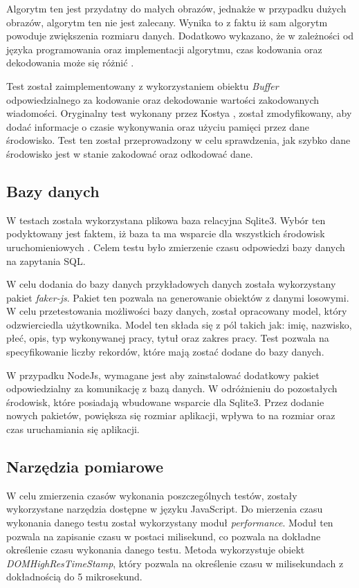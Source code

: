 Algorytm ten jest przydatny do małych obrazów, jednakże w przypadku dużych obrazów, algorytm ten nie jest zalecany. Wynika to z faktu iż sam algorytm powoduje zwiększenia rozmiaru danych. Dodatkowo wykazano, że w zależności od języka programowania oraz implementacji algorytmu, czas kodowania oraz dekodowania może się różnić \cite{cryptoeprint:2022/361}.

Test został zaimplementowany z wykorzystaniem obiektu \textit{Buffer} odpowiedzialnego za kodowanie oraz dekodowanie wartości zakodowanych wiadomości. Oryginalny test wykonany przez Kostya \cite{base64_benchmark}, został zmodyfikowany, aby dodać informacje o czasie wykonywania oraz użyciu pamięci przez dane środowisko. Test ten został przeprowadzony w celu sprawdzenia, jak szybko dane środowisko jest w stanie zakodować oraz odkodować dane.

\subsection{Bazy danych}
W testach została wykorzystana plikowa baza relacyjna Sqlite3. Wybór ten podyktowany jest faktem, iż baza ta ma wsparcie dla wszystkich środowisk uruchomieniowych \cite{sqlite}. Celem testu było zmierzenie czasu odpowiedzi bazy danych na zapytania SQL. 

W celu dodania do bazy danych przykładowych danych została wykorzystany pakiet \textit{faker-js}. Pakiet ten pozwala na generowanie obiektów z danymi losowymi. W celu przetestowania możliwości bazy danych, został opracowany model, który odzwierciedla użytkownika. Model ten składa się z pól takich jak: imię, nazwisko, płeć, opis, typ wykonywanej pracy, tytuł oraz zakres pracy. Test pozwala na specyfikowanie liczby rekordów, które mają zostać dodane do bazy danych.

W przypadku NodeJs, wymagane jest aby zainstalować dodatkowy pakiet odpowiedzialny za komunikację z bazą danych. W odróżnieniu do pozostałych środowisk, które posiadają wbudowane wsparcie dla Sqlite3. Przez dodanie nowych pakietów, powiększa się rozmiar aplikacji, wpływa to na rozmiar oraz czas uruchamiania się aplikacji.

\subsection{Narzędzia pomiarowe}
W celu zmierzenia czasów wykonania poszczególnych testów, zostały wykorzystane narzędzia dostępne w języku JavaScript. Do mierzenia czasu wykonania danego testu został wykorzystany moduł \textit{performance}. Moduł ten pozwala na zapisanie czasu w postaci milisekund, co pozwala na dokładne określenie czasu wykonania danego testu. Metoda wykorzystuje obiekt \textit{DOMHighResTimeStamp}, który pozwala na określenie czasu w milisekundach z dokładnością do 5 mikrosekund.

